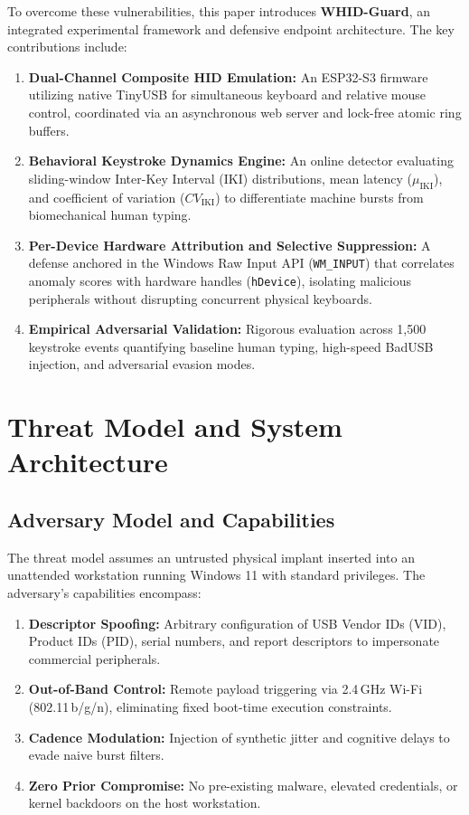 \documentclass[conference]{IEEEtran}
\begin{document}
To overcome these vulnerabilities, this paper introduces \textbf{WHID-Guard}, an integrated experimental framework and defensive endpoint architecture. The key contributions include:
\begin{enumerate}
    \item \textbf{Dual-Channel Composite HID Emulation:} An ESP32-S3 firmware utilizing native TinyUSB for simultaneous keyboard and relative mouse control, coordinated via an asynchronous web server and lock-free atomic ring buffers.
    \item \textbf{Behavioral Keystroke Dynamics Engine:} An online detector evaluating sliding-window Inter-Key Interval (IKI) distributions, mean latency ($\mu_{\text{IKI}}$), and coefficient of variation ($CV_{\text{IKI}}$) to differentiate machine bursts from biomechanical human typing.
    \item \textbf{Per-Device Hardware Attribution and Selective Suppression:} A defense anchored in the Windows Raw Input API (\texttt{WM\_INPUT}) that correlates anomaly scores with hardware handles (\texttt{hDevice}), isolating malicious peripherals without disrupting concurrent physical keyboards.
    \item \textbf{Empirical Adversarial Validation:} Rigorous evaluation across 1,500 keystroke events quantifying baseline human typing, high-speed BadUSB injection, and adversarial evasion modes.
\end{enumerate}

\section{Threat Model and System Architecture}

\subsection{Adversary Model and Capabilities}
The threat model assumes an untrusted physical implant inserted into an unattended workstation running Windows 11 with standard privileges. The adversary's capabilities encompass:
\begin{enumerate}
    \item \textbf{Descriptor Spoofing:} Arbitrary configuration of USB Vendor IDs (VID), Product IDs (PID), serial numbers, and report descriptors to impersonate commercial peripherals.
    \item \textbf{Out-of-Band Control:} Remote payload triggering via 2.4\,GHz Wi-Fi (802.11\,b/g/n), eliminating fixed boot-time execution constraints.
    \item \textbf{Cadence Modulation:} Injection of synthetic jitter and cognitive delays to evade naive burst filters.
    \item \textbf{Zero Prior Compromise:} No pre-existing malware, elevated credentials, or kernel backdoors on the host workstation.
\end{enumerate}
\end{document}
